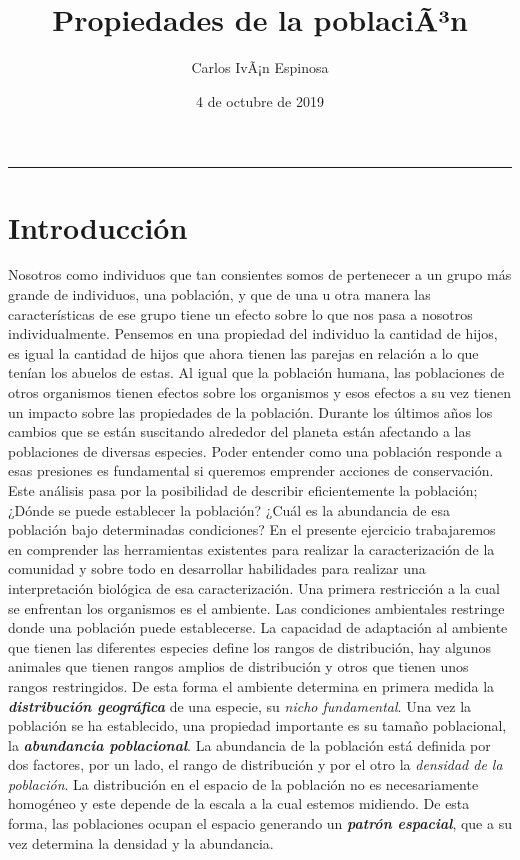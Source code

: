 \documentclass[]{article}
\title{Propiedades de la poblaciÃ³n}
\author{Carlos IvÃ¡n Espinosa}
\date{4 de octubre de 2019}
\begin{document}
\maketitle

{
\setcounter{tocdepth}{2}
\tableofcontents
}
\begin{center}\rule{0.5\linewidth}{\linethickness}\end{center}

\section{Introducción}\label{introduccion}

Nosotros como individuos que tan consientes somos de pertenecer a un
grupo más grande de individuos, una población, y que de una u otra
manera las características de ese grupo tiene un efecto sobre lo que nos
pasa a nosotros individualmente. Pensemos en una propiedad del individuo
la cantidad de hijos, es igual la cantidad de hijos que ahora tienen las
parejas en relación a lo que tenían los abuelos de estas. Al igual que
la población humana, las poblaciones de otros organismos tienen efectos
sobre los organismos y esos efectos a su vez tienen un impacto sobre las
propiedades de la población. Durante los últimos años los cambios que se
están suscitando alrededor del planeta están afectando a las poblaciones
de diversas especies. Poder entender como una población responde a esas
presiones es fundamental si queremos emprender acciones de conservación.
Este análisis pasa por la posibilidad de describir eficientemente la
población; ¿Dónde se puede establecer la población? ¿Cuál es la
abundancia de esa población bajo determinadas condiciones? En el
presente ejercicio trabajaremos en comprender las herramientas
existentes para realizar la caracterización de la comunidad y sobre todo
en desarrollar habilidades para realizar una interpretación biológica de
esa caracterización. Una primera restricción a la cual se enfrentan los
organismos es el ambiente. Las condiciones ambientales restringe donde
una población puede establecerse. La capacidad de adaptación al ambiente
que tienen las diferentes especies define los rangos de distribución,
hay algunos animales que tienen rangos amplios de distribución y otros
que tienen unos rangos restringidos. De esta forma el ambiente determina
en primera medida la \textbf{\emph{distribución geográfica}} de una
especie, su \emph{nicho fundamental}. Una vez la población se ha
establecido, una propiedad importante es su tamaño poblacional, la
\textbf{\emph{abundancia poblacional}}. La abundancia de la población
está definida por dos factores, por un lado, el rango de distribución y
por el otro la \emph{densidad de la población}. La distribución en el
espacio de la población no es necesariamente homogéneo y este depende de
la escala a la cual estemos midiendo. De esta forma, las poblaciones
ocupan el espacio generando un \textbf{\emph{patrón espacial}}, que a su
vez determina la densidad y la abundancia.
\end{document}

